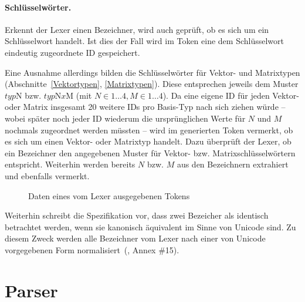 \documentclass[twoside,a4paper,fleqn,12pt]{book}
\begin{document}
\paragraph{Schlüsselwörter.} Erkennt der Lexer einen Bezeichner, wird auch geprüft, ob es sich um ein Schlüsselwort handelt. Ist dies der Fall
wird im Token eine dem Schlüsselwort eindeutig zugeordnete ID gespeichert.

Eine Ausnahme allerdings bilden die Schlüsselwörter für Vektor- und Matrixtypen (Abschnitte~\ref{Vektortypen}, \ref{Matrixtypen}). Diese entsprechen
jeweils dem Muster $\mathit{typ}\mathrm{N}$ bzw. $\mathit{typ}\mathrm{N}\mathit{x}\mathrm{M}$ (mit $N \in 1 \dots 4, M \in 1 \dots 4$).
Da eine eigene ID für jeden Vektor- oder Matrix insgesamt 20 weitere IDs pro Basis-Typ nach sich ziehen würde -- wobei später noch jeder ID wiederum
die ursprünglichen Werte für $N$ und $M$ nochmals zugeordnet
werden müssten -- wird im generierten Token vermerkt, ob es sich um einen Vektor- oder Matrixtyp handelt.
Dazu überprüft der Lexer, ob ein Bezeichner den angegebenen Muster für Vektor- bzw. Matrixschlüsselwörtern entspricht.
Weiterhin werden bereits $N$ bzw. $M$ aus den Bezeichnern extrahiert und ebenfalls vermerkt.

\begin{figure}[h]
   \centering
  
  \caption{Daten eines vom Lexer ausgegebenen Tokens}
  \label{fig:LexerToken}
\end{figure}



Weiterhin schreibt die Spezifikation vor, dass zwei Bezeicher als identisch betrachtet werden, wenn sie kanonisch äquivalent im Sinne von Unicode sind.
Zu diesem Zweck werden alle Bezeichner vom Lexer nach einer von Unicode vorgegebenen Form normalisiert~(\cite{unicode}, Annex \#15).

\section{Parser}
\end{document}
